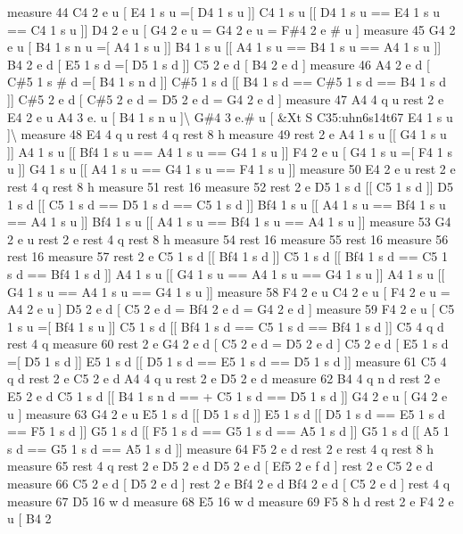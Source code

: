 measure 44 C4 2 e u \mbox{[} E4 1 s u =\mbox{[} D4 1 s u \mbox{]}\mbox{]} C4 1 s u \mbox{[}\mbox{[} D4 1 s u == E4 1 s u == C4 1 s u \mbox{]}\mbox{]} D4 2 e u \mbox{[} G4 2 e u = G4 2 e u = F\#4 2 e \# u \mbox{]} measure 45 G4 2 e u \mbox{[} B4 1 s n u =\mbox{[} A4 1 s u \mbox{]}\mbox{]} B4 1 s u \mbox{[}\mbox{[} A4 1 s u == B4 1 s u == A4 1 s u \mbox{]}\mbox{]} B4 2 e d \mbox{[} E5 1 s d =\mbox{[} D5 1 s d \mbox{]}\mbox{]} C5 2 e d \mbox{[} B4 2 e d \mbox{]} measure 46 A4 2 e d \mbox{[} C\#5 1 s \# d =\mbox{[} B4 1 s n d \mbox{]}\mbox{]} C\#5 1 s d \mbox{[}\mbox{[} B4 1 s d == C\#5 1 s d == B4 1 s d \mbox{]}\mbox{]} C\#5 2 e d \mbox{[} C\#5 2 e d = D5 2 e d = G4 2 e d \mbox{]} measure 47 A4 4 q u rest 2 e E4 2 e u A4 3 e. u \mbox{[} B4 1 s n u \mbox{]}\textbackslash{} G\#4 3 e.\# u \mbox{[} \&Xt S C35\+:uhn6s14t67 E4 1 s u \mbox{]}\textbackslash{} measure 48 E4 4 q u rest 4 q rest 8 h measure 49 rest 2 e A4 1 s u \mbox{[}\mbox{[} G4 1 s u \mbox{]}\mbox{]} A4 1 s u \mbox{[}\mbox{[} Bf4 1 s u == A4 1 s u == G4 1 s u \mbox{]}\mbox{]} F4 2 e u \mbox{[} G4 1 s u =\mbox{[} F4 1 s u \mbox{]}\mbox{]} G4 1 s u \mbox{[}\mbox{[} A4 1 s u == G4 1 s u == F4 1 s u \mbox{]}\mbox{]} measure 50 E4 2 e u rest 2 e rest 4 q rest 8 h measure 51 rest 16 measure 52 rest 2 e D5 1 s d \mbox{[}\mbox{[} C5 1 s d \mbox{]}\mbox{]} D5 1 s d \mbox{[}\mbox{[} C5 1 s d == D5 1 s d == C5 1 s d \mbox{]}\mbox{]} Bf4 1 s u \mbox{[}\mbox{[} A4 1 s u == Bf4 1 s u == A4 1 s u \mbox{]}\mbox{]} Bf4 1 s u \mbox{[}\mbox{[} A4 1 s u == Bf4 1 s u == A4 1 s u \mbox{]}\mbox{]} measure 53 G4 2 e u rest 2 e rest 4 q rest 8 h measure 54 rest 16 measure 55 rest 16 measure 56 rest 16 measure 57 rest 2 e C5 1 s d \mbox{[}\mbox{[} Bf4 1 s d \mbox{]}\mbox{]} C5 1 s d \mbox{[}\mbox{[} Bf4 1 s d == C5 1 s d == Bf4 1 s d \mbox{]}\mbox{]} A4 1 s u \mbox{[}\mbox{[} G4 1 s u == A4 1 s u == G4 1 s u \mbox{]}\mbox{]} A4 1 s u \mbox{[}\mbox{[} G4 1 s u == A4 1 s u == G4 1 s u \mbox{]}\mbox{]} measure 58 F4 2 e u C4 2 e u \mbox{[} F4 2 e u = A4 2 e u \mbox{]} D5 2 e d \mbox{[} C5 2 e d = Bf4 2 e d = G4 2 e d \mbox{]} measure 59 F4 2 e u \mbox{[} C5 1 s u =\mbox{[} Bf4 1 s u \mbox{]}\mbox{]} C5 1 s d \mbox{[}\mbox{[} Bf4 1 s d == C5 1 s d == Bf4 1 s d \mbox{]}\mbox{]} C5 4 q d rest 4 q measure 60 rest 2 e G4 2 e d \mbox{[} C5 2 e d = D5 2 e d \mbox{]} C5 2 e d \mbox{[} E5 1 s d =\mbox{[} D5 1 s d \mbox{]}\mbox{]} E5 1 s d \mbox{[}\mbox{[} D5 1 s d == E5 1 s d == D5 1 s d \mbox{]}\mbox{]} measure 61 C5 4 q d rest 2 e C5 2 e d A4 4 q u rest 2 e D5 2 e d measure 62 B4 4 q n d rest 2 e E5 2 e d C5 1 s d \mbox{[}\mbox{[} B4 1 s n d == + C5 1 s d == D5 1 s d \mbox{]}\mbox{]} G4 2 e u \mbox{[} G4 2 e u \mbox{]} measure 63 G4 2 e u E5 1 s d \mbox{[}\mbox{[} D5 1 s d \mbox{]}\mbox{]} E5 1 s d \mbox{[}\mbox{[} D5 1 s d == E5 1 s d == F5 1 s d \mbox{]}\mbox{]} G5 1 s d \mbox{[}\mbox{[} F5 1 s d == G5 1 s d == A5 1 s d \mbox{]}\mbox{]} G5 1 s d \mbox{[}\mbox{[} A5 1 s d == G5 1 s d == A5 1 s d \mbox{]}\mbox{]} measure 64 F5 2 e d rest 2 e rest 4 q rest 8 h measure 65 rest 4 q rest 2 e D5 2 e d D5 2 e d \mbox{[} Ef5 2 e f d \mbox{]} rest 2 e C5 2 e d measure 66 C5 2 e d \mbox{[} D5 2 e d \mbox{]} rest 2 e Bf4 2 e d Bf4 2 e d \mbox{[} C5 2 e d \mbox{]} rest 4 q measure 67 D5 16 w d measure 68 E5 16 w d measure 69 F5 8 h d rest 2 e F4 2 e u \mbox{[} B4 2 